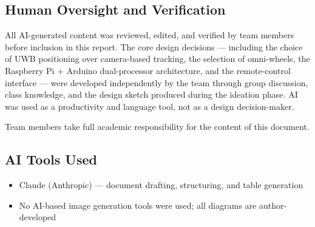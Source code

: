 \subsection{Human Oversight and Verification}

All AI-generated content was reviewed, edited, and verified by team
members before inclusion in this report. The core design decisions ---
including the choice of UWB positioning over camera-based tracking, the
selection of omni-wheels, the Raspberry Pi + Arduino dual-processor
architecture, and the remote-control interface --- were developed
independently by the team through group discussion, class knowledge, and
the design sketch produced during the ideation phase. AI was used as a
productivity and language tool, not as a design decision-maker.

Team members take full academic responsibility for the content of this
document.

\subsection{AI Tools Used}
\begin{itemize}
  \item Claude (Anthropic) --- document drafting, structuring, and table generation
  \item No AI-based image generation tools were used; all diagrams are author-developed
\end{itemize}